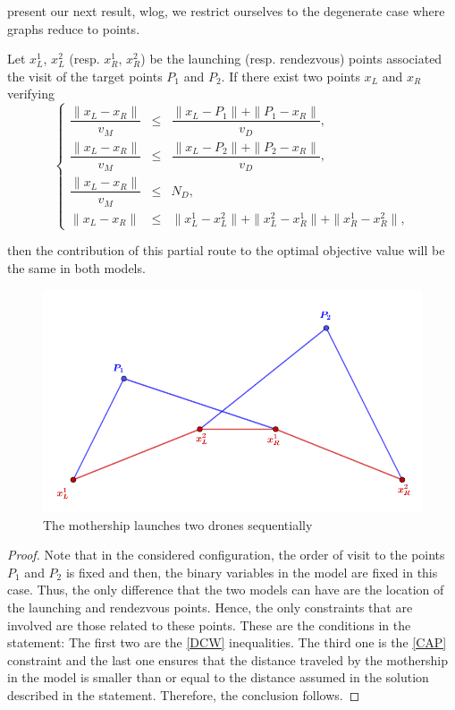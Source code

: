 {%

\noindent
{} present our next result, wlog, we restrict ourselves to the degenerate case where graphs reduce to points. 


\begin{theorem}\label{thm:relationship}
Let $x_L^1$, $x_L^2$ (resp. $x_R^1$, $x_R^2$) be the launching (resp. rendezvous) points associated  the visit of the target points $P_1$ and $P_2$. If there exist two points $x_L$ and $x_R$ verifying 
$$
 \left\{
 \begin{array}{ccl}
  \dfrac{\|x_L-x_R\|}{v_M} & \leq    & \dfrac{\|x_L - P_1\| + \|P_1 - x_R\|}{v_D}, \\
  \dfrac{\|x_L-x_R\|}{v_M} & \leq    & \dfrac{\|x_L - P_2\| + \|P_2 - x_R\|}{v_D}, \\
  \dfrac{\|x_L-x_R\|}{v_M} & \leq   & N_D, \\
  \|x_L-x_R\| & \leq & \|x_L^1 - x_L^2\| + \|x_L^2- x_R^1\| + \|x_R^1-x_R^2\|,
 \end{array}
 \right.
$$

\noindent then the contribution of this partial route to the optimal objective value will be the same in both models.
\end{theorem}
\begin{figure}[h!]
    \centering
    \includegraphics[width = 0.5\linewidth]{proof1.PNG}
    \caption{The mothership launches two drones sequentially}
    \label{fig:proof1}
\end{figure}

\begin{proof}
Note that in the considered configuration, the order of visit to the points $P_1$ and $P_2$ is fixed and then, the binary variables in the model are fixed in this case. Thus, the only difference that the two models can have are the location of the launching and rendezvous points. Hence, the only constraints that are involved are those related to these points. These are the conditions in the statement: The first two are the \eqref{DCW} inequalities. The third one is the \eqref{CAP} constraint and the last one ensures that the distance traveled by the mothership in the  model is smaller than or equal to the distance assumed in the  solution described in the statement. Therefore, the conclusion follows.


\end{proof}}
